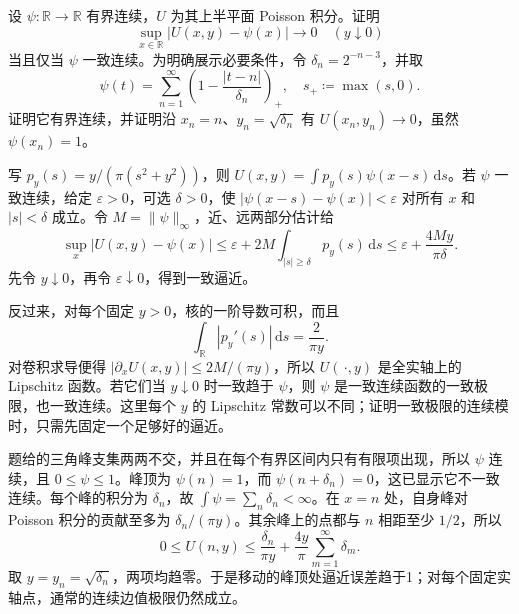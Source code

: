 \begin{exercise}[上半平面的一致边界逼近及其逆命题]\label{b3:ex:16-draft-05}
设 \(\psi:\mathbb R\to\mathbb R\) 有界连续，\(U\) 为其上半平面 Poisson 积分。证明
\[
 \sup_{x\in\mathbb R}|U(x,y)-\psi(x)|\longrightarrow0
 \quad(y\downarrow0)
\]
当且仅当 \(\psi\) 一致连续。为明确展示必要条件，令 \(\delta_n=2^{-n-3}\)，并取
\[
 \psi(t)=\sum_{n=1}^\infty
             \left(1-\frac{|t-n|}{\delta_n}\right)_+,
 \quad s_+\coloneqq\max(s,0).
\]
证明它有界连续，并证明沿 \(x_n=n\)、\(y_n=\sqrt{\delta_n}\) 有 \(U(x_n,y_n)\to0\)，虽然 \(\psi(x_n)=1\)。
\end{exercise}
\begin{solution}
写 \(p_y(s)=y/(\pi(s^2+y^2))\)，则 \(U(x,y)=\int p_y(s)\psi(x-s)\,\mathrm ds\)。若 \(\psi\) 一致连续，给定 \(\varepsilon>0\)，可选 \(\delta>0\)，使 \(|\psi(x-s)-\psi(x)|<\varepsilon\) 对所有 \(x\) 和 \(|s|<\delta\) 成立。令 \(M=\|\psi\|_\infty\)，近、远两部分估计给
\[
 \sup_x|U(x,y)-\psi(x)|
 \le\varepsilon+2M\int_{|s|\ge\delta}p_y(s)\,\mathrm ds
 \le\varepsilon+\frac{4My}{\pi\delta}.
\]
先令 \(y\downarrow0\)，再令 \(\varepsilon\downarrow0\)，得到一致逼近。

反过来，对每个固定 \(y>0\)，核的一阶导数可积，而且
\[
 \int_{\mathbb R}|p_y'(s)|\,\mathrm ds
 =\frac{2}{\pi y}.
\]
对卷积求导便得 \(|\partial_xU(x,y)|\le2M/(\pi y)\)，所以 \(U(\,\cdot,y)\) 是全实轴上的 Lipschitz 函数。若它们当 \(y\downarrow0\) 时一致趋于 \(\psi\)，则 \(\psi\) 是一致连续函数的一致极限，也一致连续。这里每个 \(y\) 的 Lipschitz 常数可以不同；证明一致极限的连续模时，只需先固定一个足够好的逼近。

题给的三角峰支集两两不交，并且在每个有界区间内只有有限项出现，所以 \(\psi\) 连续，且 \(0\le\psi\le1\)。峰顶为 \(\psi(n)=1\)，而 \(\psi(n+\delta_n)=0\)，这已显示它不一致连续。每个峰的积分为 \(\delta_n\)，故 \(\int\psi=\sum_n\delta_n<\infty\)。在 \(x=n\) 处，自身峰对 Poisson 积分的贡献至多为 \(\delta_n/(\pi y)\)。其余峰上的点都与 \(n\) 相距至少 \(1/2\)，所以
\[
 0\le U(n,y)
 \le\frac{\delta_n}{\pi y}
       +\frac{4y}{\pi}\sum_{m=1}^\infty\delta_m.
\]
取 \(y=y_n=\sqrt{\delta_n}\)，两项均趋零。于是移动的峰顶处逼近误差趋于1；对每个固定实轴点，通常的连续边值极限仍然成立。
\end{solution}

